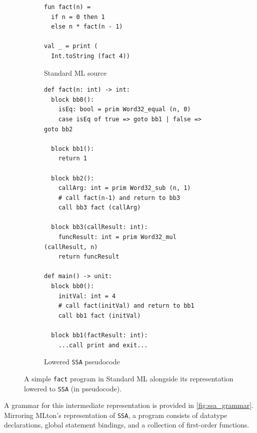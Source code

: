 \begin{figure}[htbp]
  \centering
  \begin{subfigure}[t]{0.33\textwidth}
    \caption{Standard ML source}
    \label{fig:fact_sml}
    \vspace{1mm}
\begin{verbatim}
fun fact(n) =
  if n = 0 then 1
  else n * fact(n - 1)

val _ = print (
  Int.toString (fact 4))
\end{verbatim}
  \end{subfigure}\hfill
  \begin{subfigure}[t]{0.64\textwidth}
    \caption{Lowered \texttt{SSA} pseudocode}
    \label{fig:fact_ssa}
    \vspace{1mm}
\begin{verbatim}
def fact(n: int) -> int:
  block bb0():
    isEq: bool = prim Word32_equal (n, 0)
    case isEq of true => goto bb1 | false => goto bb2

  block bb1():
    return 1

  block bb2():
    callArg: int = prim Word32_sub (n, 1)
    # call fact(n-1) and return to bb3
    call bb3 fact (callArg)

  block bb3(callResult: int):
    funcResult: int = prim Word32_mul (callResult, n)
    return funcResult

def main() -> unit:
  block bb0():
    initVal: int = 4
    # call fact(initVal) and return to bb1
    call bb1 fact (initVal)

  block bb1(factResult: int):
    ...call print and exit...
\end{verbatim}
  \end{subfigure}
  \caption{A simple \texttt{fact} program in Standard ML alongside its representation lowered to \texttt{SSA} (in pseudocode).}
  \label{fig:fact_comparison}
\end{figure}




A grammar for this intermediate representation is provided in
\cref{fig:ssa_grammar}. Mirroring MLton's representation of \texttt{SSA}, a
program consists of datatype declarations, global statement bindings, and a
collection of first-order functions.

